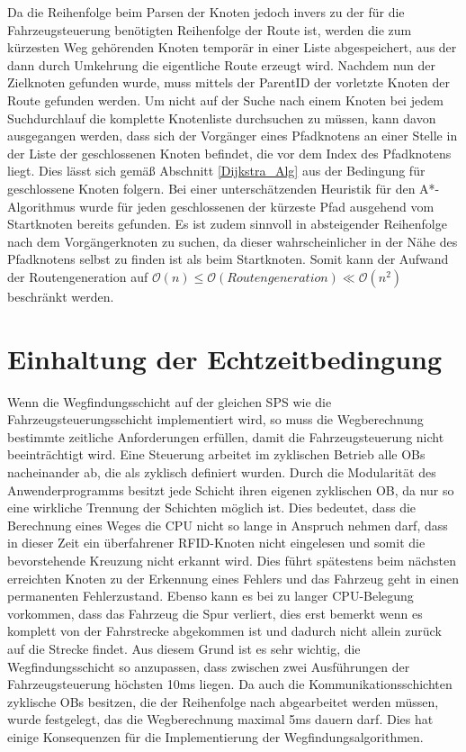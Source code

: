 			Da die Reihenfolge beim Parsen der Knoten jedoch invers zu der für die Fahrzeugsteuerung benötigten Reihenfolge der Route ist, werden die zum kürzesten Weg gehörenden Knoten temporär in einer Liste abgespeichert, aus der dann durch Umkehrung die eigentliche Route erzeugt wird. Nachdem nun der Zielknoten gefunden wurde, muss mittels der ParentID der vorletzte Knoten der Route gefunden werden. Um nicht auf der Suche nach einem Knoten bei jedem Suchdurchlauf die komplette Knotenliste durchsuchen zu müssen, kann davon ausgegangen werden, dass sich der Vorgänger eines Pfadknotens an einer Stelle in der Liste der geschlossenen Knoten befindet, die vor dem  Index des Pfadknotens liegt. Dies lässt sich gemäß Abschnitt \ref{Dijkstra_Alg} aus der Bedingung für geschlossene Knoten folgern. Bei einer unterschätzenden Heuristik für den A*-Algorithmus wurde für jeden geschlossenen der kürzeste Pfad ausgehend vom Startknoten bereits gefunden. Es ist zudem sinnvoll in absteigender Reihenfolge nach dem Vorgängerknoten zu suchen, da dieser wahrscheinlicher in der Nähe des Pfadknotens selbst zu finden ist als beim Startknoten. Somit kann der Aufwand der Routengeneration auf $\mathcal{O}(n)\le \mathcal{O}(Routengeneration)\ll \mathcal{O}(n^2)$ beschränkt werden.
			
			
	\section{Einhaltung der Echtzeitbedingung}
		
		Wenn die Wegfindungsschicht auf der gleichen \ac{SPS} wie die Fahrzeugsteuerungsschicht implementiert wird, so muss die Wegberechnung bestimmte zeitliche Anforderungen erfüllen, damit die Fahrzeugsteuerung nicht beeinträchtigt wird. Eine Steuerung arbeitet im zyklischen Betrieb alle \ac{OB}s nacheinander ab, die als zyklisch definiert wurden. Durch die Modularität des Anwenderprogramms besitzt jede Schicht ihren eigenen zyklischen \ac{OB}, da nur so eine wirkliche Trennung der Schichten möglich ist. Dies bedeutet, dass die Berechnung eines Weges die CPU nicht so lange in Anspruch nehmen darf, dass in dieser Zeit  ein überfahrener RFID-Knoten nicht eingelesen und somit die bevorstehende Kreuzung nicht erkannt wird. Dies führt spätestens beim nächsten erreichten Knoten zu der Erkennung eines Fehlers und das Fahrzeug geht in einen permanenten Fehlerzustand. Ebenso kann es bei zu langer CPU-Belegung vorkommen, dass das Fahrzeug die Spur verliert, dies erst bemerkt wenn es komplett von der Fahrstrecke abgekommen ist und dadurch nicht allein zurück auf die Strecke findet. Aus diesem Grund ist es sehr wichtig, die Wegfindungsschicht so anzupassen, dass zwischen zwei Ausführungen der Fahrzeugsteuerung höchsten 10ms liegen. Da auch die Kommunikationsschichten zyklische \ac{OB}s besitzen, die der Reihenfolge nach abgearbeitet werden müssen, wurde festgelegt, das die Wegberechnung maximal 5ms dauern darf. Dies hat einige Konsequenzen für die Implementierung der Wegfindungsalgorithmen.
		
